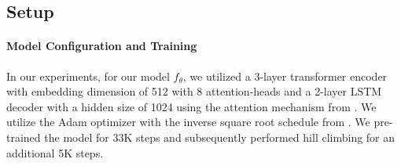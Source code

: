 \documentclass{article}
\begin{document}







\subsection{Setup}
\label{sec:setup}

\paragraph{Model Configuration and Training} In our experiments, for our model $f_{\theta}$, we utilized a 3-layer transformer encoder with embedding dimension of 512 with 8 attention-heads and a 2-layer LSTM decoder with a hidden size of 1024 using the attention mechanism from \citet{bahdanau2014neural}. We utilize the Adam optimizer \cite{kingma2014adam} with the inverse square root schedule from \citet{vaswani2017attention}. We pre-trained the model for 33K steps and subsequently performed hill climbing for an additional 5K steps. 
\end{document}
